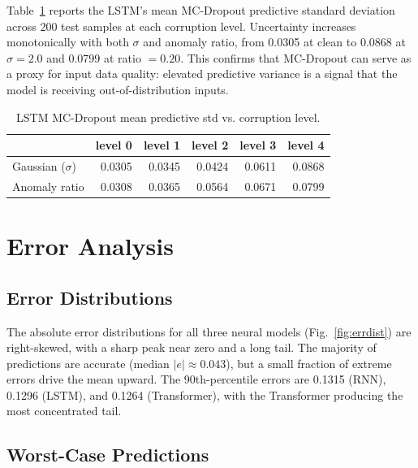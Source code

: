 \documentclass[runningheads]{llncs}
\begin{document}
Table~\ref{tab:mcstd} reports the LSTM's mean MC-Dropout predictive standard deviation across 200 test samples at each corruption level. Uncertainty increases monotonically with both $\sigma$ and anomaly ratio, from 0.0305 at clean to 0.0868 at $\sigma=2.0$ and 0.0799 at ratio $=0.20$. This confirms that MC-Dropout can serve as a proxy for input data quality: elevated predictive variance is a signal that the model is receiving out-of-distribution inputs.

\begin{table}[H]
\centering
\caption{LSTM MC-Dropout mean predictive std vs. corruption level.}
\label{tab:mcstd}
\begin{tabular}{lrrrrr}
\toprule
 & level 0 & level 1 & level 2 & level 3 & level 4 \\
\midrule
Gaussian ($\sigma$)         & 0.0305 & 0.0345 & 0.0424 & 0.0611 & 0.0868 \\
Anomaly ratio               & 0.0308 & 0.0365 & 0.0564 & 0.0671 & 0.0799 \\
\bottomrule
\end{tabular}
\end{table}

\section{Error Analysis}
\label{sec:error}

\subsection{Error Distributions}
\label{sec:errdist}

The absolute error distributions for all three neural models (Fig.~\ref{fig:errdist}) are right-skewed, with a sharp peak near zero and a long tail. The majority of predictions are accurate (median $|e| \approx 0.043$), but a small fraction of extreme errors drive the mean upward. The 90th-percentile errors are 0.1315 (RNN), 0.1296 (LSTM), and 0.1264 (Transformer), with the Transformer producing the most concentrated tail.

\subsection{Worst-Case Predictions}
\label{sec:worst}
\end{document}
